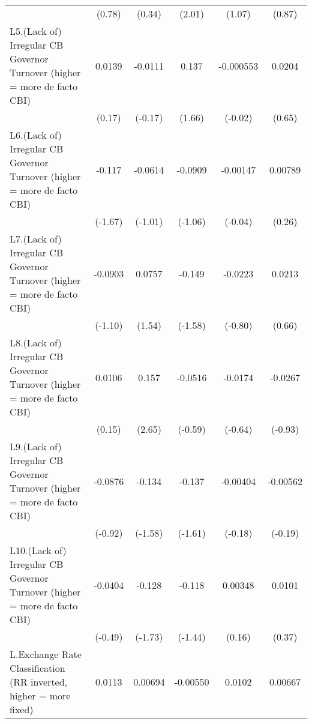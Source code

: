 {\begin{longtable}{l*{5}{c}}
                &   (0.78)         &   (0.34)         &   (2.01)         &   (1.07)         &   (0.87)         \\
\addlinespace
L5.(Lack of) Irregular CB Governor Turnover (higher = more de facto CBI)&   0.0139         &  -0.0111         &    0.137         &-0.000553         &   0.0204         \\
                &   (0.17)         &  (-0.17)         &   (1.66)         &  (-0.02)         &   (0.65)         \\
\addlinespace
L6.(Lack of) Irregular CB Governor Turnover (higher = more de facto CBI)&   -0.117         &  -0.0614         &  -0.0909         & -0.00147         &  0.00789         \\
                &  (-1.67)         &  (-1.01)         &  (-1.06)         &  (-0.04)         &   (0.26)         \\
\addlinespace
L7.(Lack of) Irregular CB Governor Turnover (higher = more de facto CBI)&  -0.0903         &   0.0757         &   -0.149         &  -0.0223         &   0.0213         \\
                &  (-1.10)         &   (1.54)         &  (-1.58)         &  (-0.80)         &   (0.66)         \\
\addlinespace
L8.(Lack of) Irregular CB Governor Turnover (higher = more de facto CBI)&   0.0106         &    0.157\sym{**} &  -0.0516         &  -0.0174         &  -0.0267         \\
                &   (0.15)         &   (2.65)         &  (-0.59)         &  (-0.64)         &  (-0.93)         \\
\addlinespace
L9.(Lack of) Irregular CB Governor Turnover (higher = more de facto CBI)&  -0.0876         &   -0.134         &   -0.137         & -0.00404         & -0.00562         \\
                &  (-0.92)         &  (-1.58)         &  (-1.61)         &  (-0.18)         &  (-0.19)         \\
\addlinespace
L10.(Lack of) Irregular CB Governor Turnover (higher = more de facto CBI)&  -0.0404         &   -0.128         &   -0.118         &  0.00348         &   0.0101         \\
                &  (-0.49)         &  (-1.73)         &  (-1.44)         &   (0.16)         &   (0.37)         \\
\addlinespace
L.Exchange Rate Classification (RR inverted, higher = more fixed)&   0.0113         &  0.00694         & -0.00550         &   0.0102         &  0.00667\sym{*}  \\

\end{longtable}}
